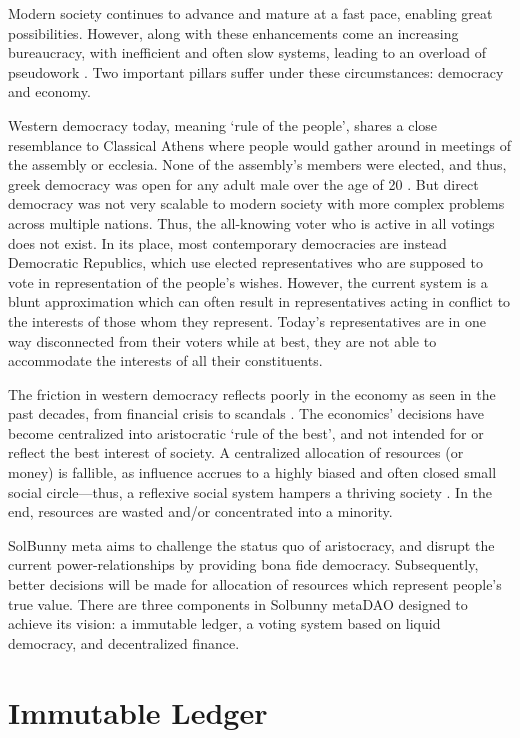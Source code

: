 \documentclass[12pt]{article}
\begin{document}
Modern society continues to advance and mature at a fast pace, enabling great possibilities. However, along with these enhancements come an increasing bureaucracy,  with inefficient and often slow systems, leading to an overload of pseudowork \cite{pseudowork}. Two important pillars suffer under these circumstances: democracy and economy. 

Western democracy today, meaning ‘rule of the people’, shares a close resemblance to Classical Athens \cite{ClassicalAthens} where people would gather around in meetings of the assembly or ecclesia. None of the assembly’s members were elected, and thus, greek democracy was open for any adult male over the age of 20 \cite{directDemocracy}. But direct democracy was not very scalable to modern society with more complex problems across multiple nations. Thus, the all-knowing voter who is active in all votings does not exist. In its place, most contemporary democracies are instead Democratic Republics, which use elected representatives who are supposed to vote in representation of the people's wishes. However, the current system is a blunt approximation which can often result in representatives acting in conflict to the interests of those whom they represent. Today’s representatives are in one way disconnected from their voters while at best, they are not able to accommodate the interests of all their constituents. 

The friction in western democracy reflects poorly in the economy as seen in the past decades, from financial crisis \cite{financialCrisis} to scandals \cite{panama, pandora}. The economics' decisions have become centralized into aristocratic ‘rule of the best’, and not intended for or reflect the best interest of society. A centralized allocation of resources (or money) is fallible, as influence accrues to a highly biased and often closed small social circle—thus, a reflexive social system hampers a thriving society \cite{reflexivity}. In the end, resources are wasted and/or concentrated into a minority.

SolBunny meta aims to challenge the status quo of aristocracy, and disrupt the current power-relationships by providing bona fide democracy. Subsequently, better decisions will be made for allocation of resources which represent people’s true value. There are three components in Solbunny metaDAO designed to achieve its vision: a immutable ledger, a voting system based on liquid democracy, and decentralized finance.


\section*{Immutable Ledger}
\end{document}
